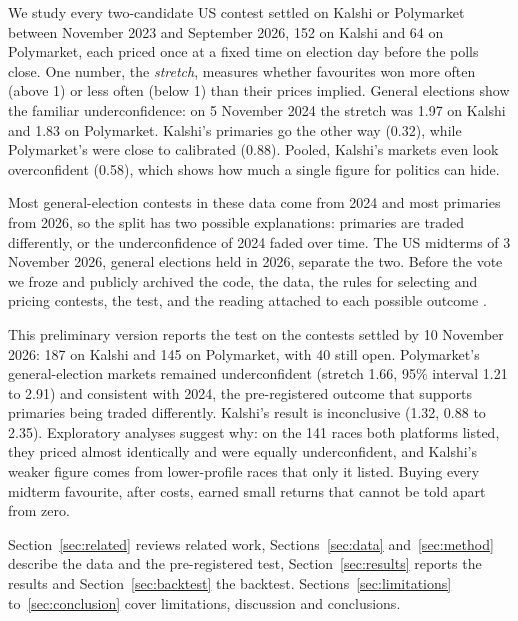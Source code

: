 We study every two-candidate US contest settled on Kalshi or Polymarket between November 2023 and September 2026, 152
on Kalshi and 64 on Polymarket, each priced once at a fixed time on election day before the polls close. One number,
the \emph{stretch}, measures whether favourites won more often (above 1) or less often (below 1) than their prices
implied. General elections show the familiar underconfidence: on 5 November 2024 the stretch was 1.97 on Kalshi and
1.83 on Polymarket. Kalshi's primaries go the other way (0.32), while Polymarket's were close to calibrated (0.88).
Pooled, Kalshi's markets even look overconfident (0.58), which shows how much a single figure for politics can hide.

Most general-election contests in these data come from 2024 and most primaries from 2026, so the split has two possible
explanations: primaries are traded differently, or the underconfidence of 2024 faded over time. The US midterms of
3 November 2026, general elections held in 2026, separate the two. Before the vote we froze and publicly archived the
code, the data, the rules for selecting and pricing contests, the test, and the reading attached to each possible
outcome \citep{kirillov2026code,kirillov2026data}.

This preliminary version reports the test on the contests settled by 10 November 2026: 187 on Kalshi and 145 on
Polymarket, with 40 still open. Polymarket's general-election markets remained underconfident (stretch 1.66, 95\%
interval 1.21 to 2.91) and consistent with 2024, the pre-registered outcome that supports primaries being traded
differently. Kalshi's result is inconclusive (1.32, 0.88 to 2.35). Exploratory analyses suggest why: on the 141 races
both platforms listed, they priced almost identically and were equally underconfident, and Kalshi's weaker figure comes
from lower-profile races that only it listed. Buying every midterm favourite, after costs, earned small returns
that cannot be told apart from zero.

Section~\ref{sec:related} reviews related work, Sections~\ref{sec:data} and~\ref{sec:method} describe the data and the
pre-registered test, Section~\ref{sec:results} reports the results and Section~\ref{sec:backtest} the backtest.
Sections~\ref{sec:limitations} to~\ref{sec:conclusion} cover limitations, discussion and conclusions.
